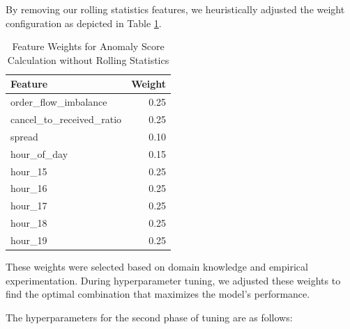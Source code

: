 \documentclass[conference]{IEEEtran}
\begin{document}
\par By removing our rolling statistics features, we heuristically adjusted the weight configuration as depicted in Table \ref{tab:hyper_adapt}.

\begin{table}[H]
    \centering
    \caption{Feature Weights for Anomaly Score Calculation without Rolling Statistics}
    \label{tab:hyper_adapt}
    \begin{tabular}{|l|r|}
        \hline
        \textbf{Feature} & \textbf{Weight} \\
        \hline
        order\_flow\_imbalance & 0.25 \\
        cancel\_to\_received\_ratio & 0.25 \\
        spread & 0.10 \\
        hour\_of\_day & 0.15 \\
        hour\_15 & 0.25 \\
        hour\_16 & 0.25 \\
        hour\_17 & 0.25 \\
        hour\_18 & 0.25 \\
        hour\_19 & 0.25 \\
        \hline
    \end{tabular}
\end{table}

\par These weights were selected based on domain knowledge and empirical experimentation. During hyperparameter tuning, we adjusted these weights to find the optimal combination that maximizes the model's performance.

\par The hyperparameters for the second phase of tuning are as follows:
\end{document}
